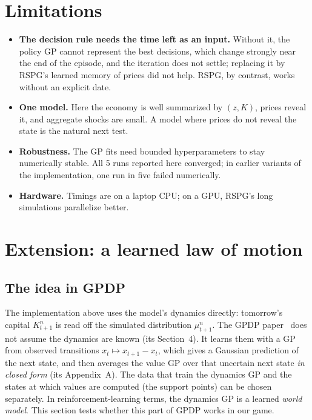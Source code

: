\documentclass[11pt,a4paper]{article}
\begin{document}
\section{Limitations}
\begin{itemize}
\item \textbf{The decision rule needs the time left as an input.} Without it, the policy GP cannot
  represent the best decisions, which change strongly near the end of the episode, and the iteration
  does not settle; replacing it by RSPG's learned memory of prices did not help. RSPG, by contrast,
  works without an explicit date.
\item \textbf{One model.} Here the economy is well summarized by $(z, K)$, prices reveal it, and
  aggregate shocks are small. A model where prices do not reveal the state is the natural next test.
\item \textbf{Robustness.} The GP fits need bounded hyperparameters to stay numerically stable. All 5
  runs reported here converged; in earlier variants of the implementation, one run in five failed
  numerically.
\item \textbf{Hardware.} Timings are on a laptop CPU; on a GPU, RSPG's long simulations parallelize
  better.
\end{itemize}

\section{Extension: a learned law of motion}\label{sec:lom}

\subsection{The idea in GPDP}

The implementation above uses the model's dynamics directly: tomorrow's capital $K_{t+1}^n$ is read
off the simulated distribution $\mu_{t+1}^n$. The GPDP paper~\cite{deisenroth} does not assume the
dynamics are known (its Section~4). It learns them with a GP from observed transitions
$x_t \mapsto x_{t+1} - x_t$, which gives a Gaussian prediction of the next state, and then averages
the value GP over that uncertain next state \emph{in closed form} (its Appendix~A). The data that
train the dynamics GP and the states at which values are computed (the support points) can be
chosen separately. In reinforcement-learning terms, the dynamics GP is a learned \emph{world model}.
This section tests whether this part of GPDP works in our game.
\end{document}
